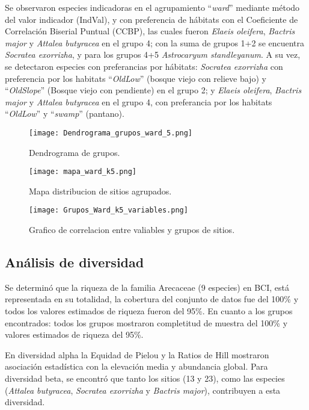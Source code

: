 \documentclass[11pt,]{article}
\begin{document}
Se observaron especies indicadoras en el agrupamiento ``\emph{ward}''
mediante método del valor indicador (IndVal), y con preferencia de
hábitats con el Coeficiente de Correlación Biserial Puntual (CCBP), las
cuales fueron \emph{Elaeis oleifera}, \emph{Bactris major} y
\emph{Attalea butyracea} en el grupo 4; con la suma de grupos 1+2 se
encuentra \emph{Socratea exorrizha}, y para los grupos 4+5
\emph{Astrocaryum standleyanum}. A su vez, se detectaron especies con
preferancias por hábitats: \emph{Socratea exorrizha} con preferencia por
los habitats ``\emph{OldLow}'' (bosque viejo con relieve bajo) y
``\emph{OldSlope}'' (Bosque viejo con pendiente) en el grupo 2; y
\emph{Elaeis oleifera}, \emph{Bactris major} y \emph{Attalea butyracea}
en el grupo 4, con preferancia por los habitats ``\emph{OldLow}'' y
``\emph{swamp}'' (pantano).

\begin{figure}
\centering
\texttt{[image: Dendrograma\_grupos\_ward\_5.png]}
\caption{Dendrograma de grupos. \label{fig:Dendrograma_grupos_ward_5}}
\end{figure}

\begin{figure}
\centering
\texttt{[image: mapa\_ward\_k5.png]}
\caption{Mapa distribucion de sitios agrupados.
\label{fig:mapa_ward_k5}}
\end{figure}

\begin{figure}
\centering
\texttt{[image: Grupos\_Ward\_k5\_variables.png]}
\caption{Grafico de correlacion entre valiables y grupos de sitios.
\label{fig:Grupos_Ward_k5_variables}}
\end{figure}

\subsection{Análisis de diversidad}\label{anuxe1lisis-de-diversidad}

Se determinó que la riqueza de la familia Arecaceae (9 especies) en BCI,
está representada en su totalidad, la cobertura del conjunto de datos
fue del 100\% y todos los valores estimados de riqueza fueron del 95\%.
En cuanto a los grupos encontrados: todos los grupos mostraron
completitud de muestra del 100\% y valores estimados de riqueza del
95\%.

En diversidad alpha la Equidad de Pielou y la Ratios de Hill mostraron
asociación estadística con la elevación media y abundancia global. Para
diversidad beta, se encontró que tanto los sitios (13 y 23), como las
especies (\emph{Attalea butyracea}, \emph{Socratea exorrizha} y
\emph{Bactris major}), contribuyen a esta diversidad.
\end{document}
